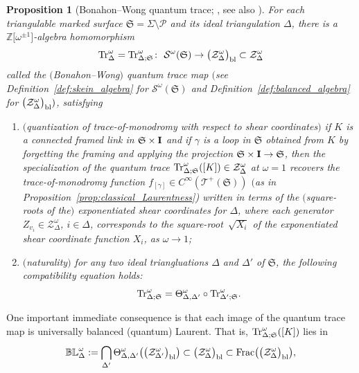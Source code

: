 \documentclass[pdftex]{sigma}
\numberwithin{equation}{section}
\newtheorem{Proposition}[Theorem]{Proposition}
\theoremstyle{definition}
\begin{document}
\begin{Proposition}[Bonahon--Wong quantum trace; \cite{BW}, see also \cite{Le19}]
\label{prop:BW}
For each triangulable marked surface $\mathfrak{S} = \Sigma\setminus\mathcal{P}$ and its ideal triangulation $\Delta$, there is a $\mathbb{Z}\bigl[\omega^{\pm 1}\bigr]$-algebra homomorphism
\[
{\rm Tr}^\omega_\Delta = {\rm Tr}^\omega_{\Delta;\mathfrak{S}} \colon \ \mathcal{S}^\omega(\mathfrak{S}) \to \bigl(\mathcal{Z}^\omega_\Delta\bigr)_{\rm bl} \subset \mathcal{Z}^\omega_\Delta
\]
called the {\em $($Bonahon--Wong$)$ quantum trace} map $($see Definition~{\rm \ref{def:skein_algebra}} for $\mathcal{S}^\omega(\mathfrak{S})$ and Definition~{\rm \ref{def:balanced_algebra}} for $\bigl(\mathcal{Z}^\omega_\Delta\bigr)_{\rm bl})$, satisfying
\begin{enumerate}[label={\rm (QT\arabic*)}]\itemsep=0pt\setlength{\leftskip}{0.30cm}
\item\label{QT1} $($quantization of trace-of-monodromy with respect to shear coordinates$)$ if $K$ is a connected framed link in $\mathfrak{S} \times {\bf I}$ and if $\gamma$ is a loop in $\mathfrak{S}$ obtained from $K$ by forgetting the framing and applying the projection $\mathfrak{S} \times {\bf I} \to \mathfrak{S}$, then the specialization of the quantum trace ${\rm Tr}^\omega_{\Delta;\mathfrak{S}}([K]) \in \mathcal{Z}^\omega_\Delta$ at $\omega=1$ recovers the trace-of-monodromy function $f_{[\gamma]} \in C^\infty(\mathscr{T}^+(\mathfrak{S}))$ $($as in Proposition~{\rm \ref{prop:classical_Laurentness})} written in terms of the $($square-roots of the$)$ exponentiated shear coordinates for $\Delta$, where each generator $Z_{v_i} \in \mathcal{Z}^\omega_\Delta$, $i\in \Delta$, corresponds to the square-root~$\sqrt{X_i}$ of the exponentiated shear coordinate function $X_i$, as $\omega \to 1$;
\item\label{QT2} $($naturality$)$ for any two ideal triangluations $\Delta$ and $\Delta'$ of $\mathfrak{S}$, the following compatibility equation holds:
\[
{\rm Tr}^\omega_{\Delta;\mathfrak{S}} = \Theta^\omega_{\Delta,\Delta'} \circ {\rm Tr}^\omega_{\Delta';\mathfrak{S}}.
\]
\end{enumerate}
\end{Proposition}
One important immediate consequence is that each image of the quantum trace map is universally balanced (quantum) Laurent. That is, ${\rm Tr}^\omega_{\Delta;\mathfrak{S}}([K])$ lies in
\begin{align*}
\mathbb{BL}^\omega_\Delta := \bigcap_{\Delta'} \Theta^\omega_{\Delta,\Delta'}\bigl( \bigl(\mathcal{Z}^\omega_{\Delta'}\bigr)_{\rm bl} \bigr) \subset \bigl(\mathcal{Z}^\omega_\Delta\bigr)_{\rm bl} \subset {\rm Frac}\bigl( \bigl( \mathcal{Z}^\omega_\Delta\bigr)_{\rm bl} \bigr),
\end{align*}
\end{document}
